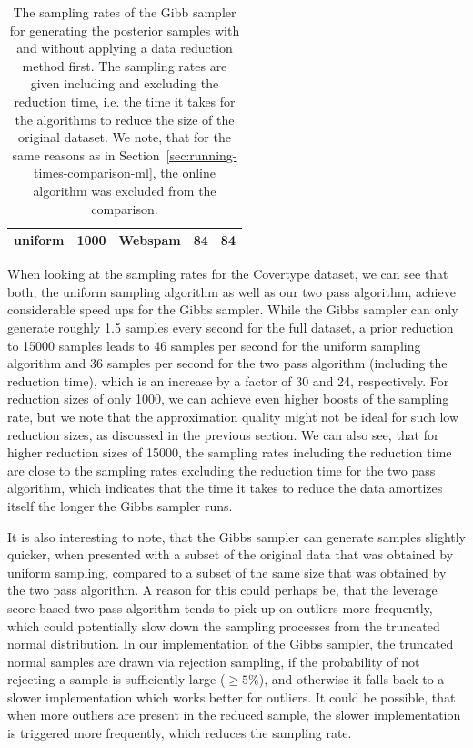 \begin{table}[ht!]
\begin{tabular}{ l | l| l| l| l}
        uniform         & 1000          & Webspam          & 84                                  & 84  \\ \hline
    \end{tabular}
    \caption{The sampling rates of the Gibb sampler for
        generating the posterior samples with and without applying a data
        reduction method first.
        The sampling rates are given including and excluding the
        reduction time, i.e. the time it takes for the algorithms
        to reduce the size of the original dataset.
        We note, that for the same reasons as in
        Section~\ref{sec:running-times-comparison-ml}, the
        online algorithm was excluded from the comparison.}
    \label{tab:running-times-bayes}
\end{table}

When looking at the sampling rates for the Covertype dataset, we can
see that both, the uniform sampling algorithm as well as our
two pass algorithm, achieve considerable speed ups for the Gibbs
sampler. While the Gibbs sampler can only generate roughly
1.5 samples every second for the full dataset, a prior reduction
to 15000 samples leads to 46 samples per second for the uniform
sampling algorithm and 36 samples per second for the two pass
algorithm (including the reduction time),
which is an increase by a factor of 30 and 24, respectively.
For reduction sizes of only 1000, we can achieve even higher
boosts of the sampling rate, but we note that the approximation
quality might not be ideal for such low reduction sizes, as
discussed in the previous section.
We can also see, that for higher reduction sizes of 15000, the
sampling rates including the reduction time are close to the
sampling rates excluding the reduction time for the two pass
algorithm, which indicates that the time it takes to reduce the
data amortizes itself the longer the Gibbs sampler runs.

It is also interesting to note, that the Gibbs sampler can generate
samples slightly quicker, when presented with a subset of the
original data that was obtained
by uniform sampling, compared to a subset of the same size
that was obtained by
the two pass algorithm.
A reason for this could perhaps be, that the leverage score based
two pass algorithm tends to pick up on outliers more frequently,
which could potentially slow down the sampling processes from
the truncated normal distribution.
In our implementation of the Gibbs sampler, the truncated normal
samples are drawn via rejection sampling, if the probability of
not rejecting a sample is sufficiently large ($\geq 5\%$), and otherwise
it falls back to a slower implementation which works better for
outliers. It could be possible, that when more outliers are present
in the reduced sample, the slower implementation is triggered more
frequently, which reduces the sampling rate.

